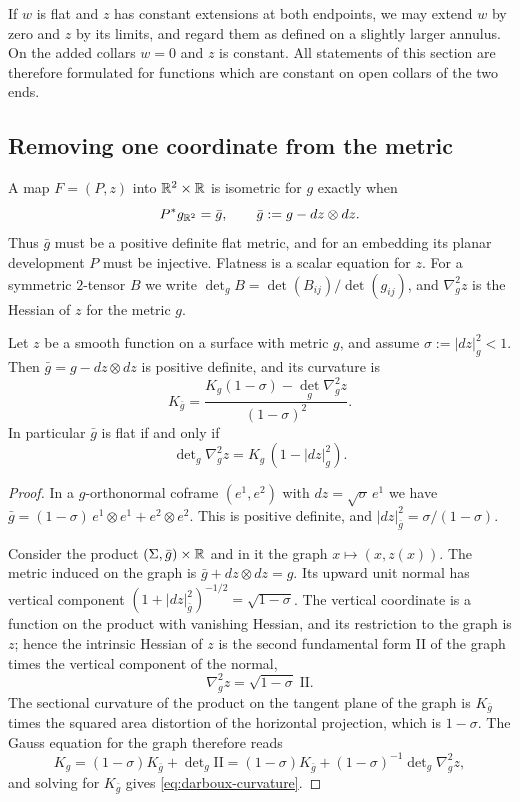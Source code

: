 If $w$ is flat and $z$ has constant extensions at both endpoints, we
may extend $w$ by zero and $z$ by its limits, and regard them as
defined on a slightly larger annulus. On the added collars $w=0$ and
$z$ is constant. All statements of this section are therefore
formulated for functions which are constant on open collars of the two
ends.

\subsection{Removing one coordinate from the metric}

A map $F=(P,z)$ into $\mathbb R^2\times\mathbb R$ is isometric for $g$ exactly when
\[
 P^*g_{\mathbb R^2}=\bar g,\qquad \bar g:=g-dz\otimes dz .
\]
Thus $\bar g$ must be a positive definite flat metric, and for an
embedding its planar development $P$ must be injective. Flatness is a
scalar equation for $z$. For a symmetric $2$-tensor $B$ we write
$\det_gB=\det(B_{ij})/\det(g_{ij})$, and $\nabla_g^2z$ is the Hessian
of $z$ for the metric $g$.

\begin{lemma}\label{lem:darboux-invariant}
Let $z$ be a smooth function on a surface with metric $g$, and assume
$\sigma:=|dz|_g^2<1$. Then $\bar g=g-dz\otimes dz$ is positive
definite, and its curvature is
\begin{equation}\label{eq:darboux-curvature}
 K_{\bar g}=
 \frac{K_g(1-\sigma)-\det_g\nabla_g^2z}{(1-\sigma)^2}.
\end{equation}
In particular $\bar g$ is flat if and only if
\begin{equation}\label{eq:intro-darboux}
 \det\nolimits_g\nabla_g^2z=K_g\,(1-|dz|_g^2).
\end{equation}
\end{lemma}

\begin{proof}
In a $g$-orthonormal coframe $(e^1,e^2)$ with $dz=\sqrt\sigma\,e^1$ we
have $\bar g=(1-\sigma)\,e^1\otimes e^1+e^2\otimes e^2$. This is
positive definite, and $|dz|_{\bar g}^2=\sigma/(1-\sigma)$.

Consider the product $(\Sigma,\bar g)\times\mathbb R$ and in it the graph
$x\mapsto(x,z(x))$. The metric induced on the graph is
$\bar g+dz\otimes dz=g$. Its upward unit normal has vertical component
$(1+|dz|_{\bar g}^2)^{-1/2}=\sqrt{1-\sigma}$. The vertical coordinate
is a function on the product with vanishing Hessian, and its restriction
to the graph is $z$; hence the intrinsic Hessian of $z$ is the second
fundamental form $\mathrm{II}$ of the graph times the vertical
component of the normal,
\[
 \nabla_g^2z=\sqrt{1-\sigma}\;\mathrm{II}.
\]
The sectional curvature of the product on the tangent plane of the
graph is $K_{\bar g}$ times the squared area distortion of the
horizontal projection, which is $1-\sigma$. The Gauss equation for the
graph therefore reads
\[
 K_g=(1-\sigma)K_{\bar g}+\det\nolimits_g\mathrm{II}
    =(1-\sigma)K_{\bar g}+(1-\sigma)^{-1}\det\nolimits_g\nabla_g^2z ,
\]
and solving for $K_{\bar g}$ gives \eqref{eq:darboux-curvature}.
\end{proof}

